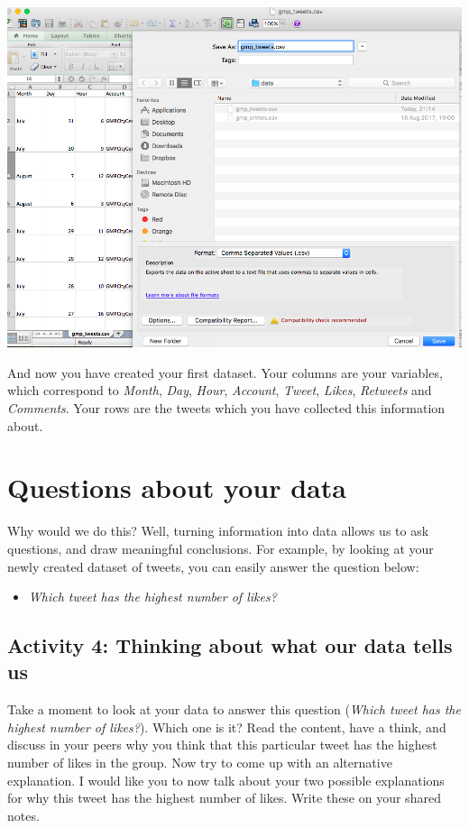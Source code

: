 \documentclass[
]{book}
\providecommand{\tightlist}{%
  \setlength{\itemsep}{0pt}\setlength{\parskip}{0pt}}
\begin{document}
\includegraphics{imgs/save_tweets.png}

And now you have created your first dataset. Your columns are your variables, which correspond to \emph{Month}, \emph{Day}, \emph{Hour}, \emph{Account}, \emph{Tweet}, \emph{Likes}, \emph{Retweets} and \emph{Comments}. Your rows are the tweets which you have collected this information about.

\hypertarget{questions-about-your-data}{%
\section{Questions about your data}\label{questions-about-your-data}}

Why would we do this? Well, turning information into data allows us to ask questions, and draw meaningful conclusions. For example, by looking at your newly created dataset of tweets, you can easily answer the question below:

\begin{itemize}
\tightlist
\item
  \emph{Which tweet has the highest number of likes?}
\end{itemize}

\hypertarget{activity-4-thinking-about-what-our-data-tells-us}{%
\subsection{Activity 4: Thinking about what our data tells us}\label{activity-4-thinking-about-what-our-data-tells-us}}

Take a moment to look at your data to answer this question (\emph{Which tweet has the highest number of likes?}). Which one is it? Read the content, have a think, and discuss in your peers why you think that this particular tweet has the highest number of likes in the group. Now try to come up with an alternative explanation. I would like you to now talk about your two possible explanations for why this tweet has the highest number of likes. Write these on your shared notes.
\end{document}
